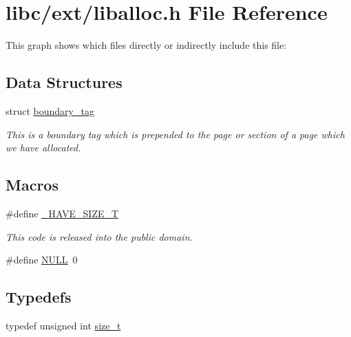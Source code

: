 \hypertarget{a00026}{}\section{libc/ext/liballoc.h File Reference}
\label{a00026}
This graph shows which files directly or indirectly include this file\+:
\subsection*{Data Structures}
\begin{DoxyCompactItemize}
\item 
struct \hyperlink{a00095}{boundary\+\_\+tag}
\begin{DoxyCompactList}\small\item\em This is a boundary tag which is prepended to the page or section of a page which we have allocated. \end{DoxyCompactList}\end{DoxyCompactItemize}
\subsection*{Macros}
\begin{DoxyCompactItemize}
\item 
\#define \hyperlink{a00026_a40684528083f4cc0dfe3ca1accae3f79_a40684528083f4cc0dfe3ca1accae3f79}{\+\_\+\+H\+A\+V\+E\+\_\+\+S\+I\+Z\+E\+\_\+T}
\begin{DoxyCompactList}\small\item\em This code is released into the public domain. \end{DoxyCompactList}\item 
\#define \hyperlink{a00026_a070d2ce7b6bb7e5c05602aa8c308d0c4_a070d2ce7b6bb7e5c05602aa8c308d0c4}{N\+U\+LL}~0
\end{DoxyCompactItemize}
\subsection*{Typedefs}
\begin{DoxyCompactItemize}
\item 
typedef unsigned int \hyperlink{a00026_a7c94ea6f8948649f8d181ae55911eeaf_a7c94ea6f8948649f8d181ae55911eeaf}{size\+\_\+t}
\end{DoxyCompactItemize}
